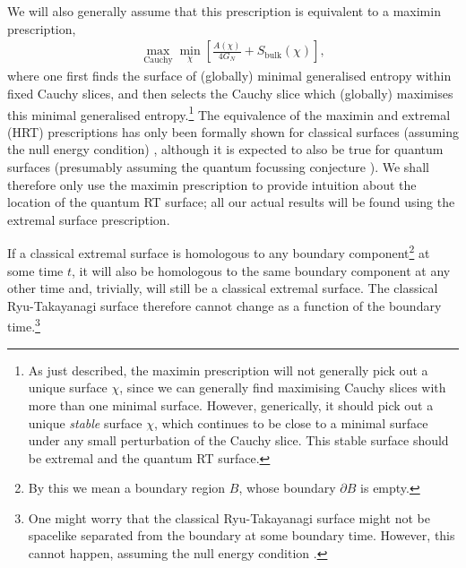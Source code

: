 \documentclass[11pt,a4paper]{article}
\begin{document}
We will also generally assume that this prescription is equivalent to a maximin prescription,
\begin{align}
\max_{\text{Cauchy}} \min_{\chi} \left[\frac{A(\chi)}{4 G_N} + S_\text{bulk}(\chi)\right],
\end{align}
where one first finds the surface of (globally) minimal generalised entropy within fixed Cauchy slices, and then selects the Cauchy slice which (globally) maximises this minimal generalised entropy.\footnote{As just described, the maximin prescription will not generally pick out a unique surface $\chi$, since we can generally find maximising Cauchy slices with more than one minimal surface. However, generically, it should pick out a unique \emph{stable} surface $\chi$, which continues to be close to a minimal surface under any small perturbation of the Cauchy slice. This stable surface should be extremal and the quantum RT surface.} The equivalence of the maximin and extremal (HRT) prescriptions has only been formally shown for classical surfaces (assuming the null energy condition) \cite{wall2014maximin}, although it is expected to also be true for quantum surfaces \cite{engelhardt2015quantum} (presumably assuming the quantum focussing conjecture \cite{bousso2016quantum}). We shall therefore only use the maximin prescription to provide intuition about the location of the quantum RT surface; all our actual results will be found using the extremal surface prescription.

If a classical extremal surface is homologous to any boundary component\footnote{By this we mean a boundary region $B$, whose boundary $\partial B$ is empty.} at some time $t$, it will also be homologous to the same boundary component at any other time and, trivially, will still be a classical extremal surface. The classical Ryu-Takayanagi surface therefore cannot change as a function of the boundary time.\footnote{One might worry that the classical Ryu-Takayanagi surface might not be spacelike separated from the boundary at some boundary time. However, this cannot happen, assuming the null energy condition \cite{wall2014maximin}.}
\end{document}
